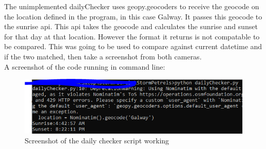    The unimplemented dailyChecker uses geopy.geocoders to receive the geocode on the location defined in the program, in this case Galway. It passes this geocode to the sunrise api. This api takes the geocode and calculates the sunrise and sunset for that day at that location. However the format it returns is not compatable to be compared. This was going to be used to compare against current datetime and if the two matched, then take a screenshot from both cameras. \\ A screenshot of the code running in command line: 
   \begin{figure}[!htbp] 
       \centering
      \includegraphics[scale=1]{img/ssDailychecker.PNG}
       \caption{Screenshot of the daily checker script working}
       \label{fig:my_label}
   \end{figure}    
  
